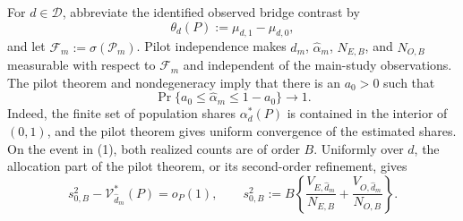 For \(d\in\mathcal D\), abbreviate the identified observed bridge contrast by
\[
 \theta_d(P):=\mu_{d,1}-\mu_{d,0},
\]
and let \(\mathcal F_m:=\sigma(\mathcal P_m)\).  Pilot independence makes \(\widehat d_m\), \(\widehat\alpha_m\), \(N_{E,B}\), and \(N_{O,B}\) measurable with respect to \(\mathcal F_m\) and independent of the main-study observations.  The pilot theorem and nondegeneracy imply that there is an \(a_0>0\) such that
\[
 \Pr\{a_0\le\widehat\alpha_m\le1-a_0\}\longrightarrow1.                  \tag{1}
\]
Indeed, the finite set of population shares \(\alpha_d^*(P)\) is contained in the interior of \((0,1)\), and the pilot theorem gives uniform convergence of the estimated shares.  On the event in (1), both realized counts are of order \(B\).  Uniformly over \(d\), the allocation part of the pilot theorem, or its second-order refinement, gives
\[
 s_{0,B}^2-\mathcal V_{\widehat d_m}^*(P)=o_P(1),
 \qquad
 s_{0,B}^2:=B\left\{
 \frac{V_{E,\widehat d_m}}{N_{E,B}}
 +\frac{V_{O,\widehat d_m}}{N_{O,B}}\right\}.                             \tag{2}
\]

